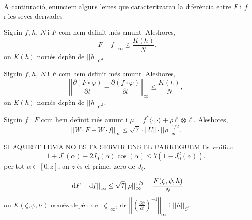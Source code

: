 A continuació, enunciem alguns lemes que caracteritzaran la diferència entre $F$ i $f$ i les seves derivades.

\begin{lema}
    \label{lema:lema2}
    Siguin $f$, $h$, $N$ i $F$ com hem definit més amunt. Aleshores,
    \begin{equation*}
        ||F-f||_\infty \le \frac{K(h)}{N},
    \end{equation*}
    on $K(h)$ només depèn de $||h||_{C^1}$.
\end{lema}

\begin{lema}
    \label{lema:lema3}
    Siguin $f$, $h$, $N$ i $F$ com hem definit més amunt. Aleshores,
    \begin{equation*}
        \left|\left|\frac{\partial (F\circ \varphi)}{\partial t}-\frac{\partial (f\circ \varphi)}{\partial t}\right|\right|_\infty \le \frac{K(h)}{N},
    \end{equation*}
    on $K(h)$ només depèn de $||h||_{C^2}$.
\end{lema}

\begin{lema}
    \label{lema:lema4}
    Siguin $f$ i $F$ com hem definit més amunt i $\mu = f^*\langle\cdot, \cdot\rangle + \rho\ell\otimes\ell$. Aleshores,
    \begin{equation*}
        \left|\left|W\cdot F-W\cdot f\right|\right|_\infty \le \sqrt7\cdot||U||\cdot||\rho||^{1/2}_\infty.
    \end{equation*}
\end{lema}

\begin{lema}
    {\color{blue} SI AQUEST LEMA NO ES FA SERVIR ENS EL CARREGUEM}
    Es verifica
    \begin{equation*}
        1+J_0^2(\alpha)-2J_0(\alpha)\cos(\alpha) \le 7(1-J_0^2(\alpha)).
    \end{equation*}
    per tot $\alpha\in[0,z]$, on $z$ és el primer zero de $J_0$.
\end{lema}

\begin{lema}
    \label{lema:lema6}
    \begin{equation*}
        \left|\left| \text dF -\text df \right|\right|_\infty \le \sqrt{7}||\rho||^{1/2}_\infty + \frac{K(\zeta,\psi,h)}{N}
    \end{equation*}
    on $K(\zeta,\psi,h)$ només depèn de $||\zeta||_\infty$, de $\left|\left|\left(  \frac{\partial\psi}{\partial t}\right)^{-1}\right|\right|_\infty$ i $||h||_{C^2}$.
\end{lema}

